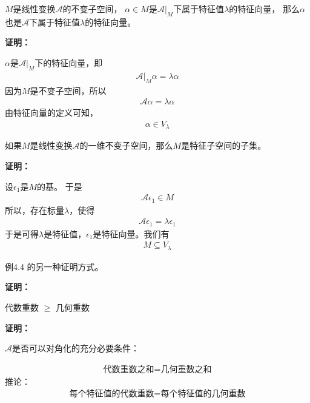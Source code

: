 \documentclass{article}
\begin{document}
\begin{zremark}
  $M$是线性变换$\mathscr{A}$的不变子空间，
  $\alpha \in M$是$\mathscr{A}|_M$下属于特征值$\lambda$的特征向量，
  那么$\alpha$也是$\mathscr{A}$下属于特征值$\lambda$的特征向量。
\end{zremark}

\textbf{证明：}

$\alpha$是$\mathscr{A}|_M$下的特征向量，即
\begin{align*}
  \mathscr{A}|_M \alpha = \lambda \alpha
\end{align*}
因为$M$是不变子空间，所以
\begin{align*}
  \mathscr{A} \alpha = \lambda \alpha
\end{align*}
由特征向量的定义可知，
\begin{align*}
  \alpha \in V_{\lambda}
\end{align*}

\begin{zremark}
  如果$M$是线性变换$\mathscr{A}$的一维不变子空间，那么$M$是特征子空间的子集。
\end{zremark}

\textbf{证明：}

设$\epsilon_1$是$M$的基。
于是
\begin{align*}
  \mathscr{A} \epsilon_1 \in M
\end{align*}
所以，存在标量$\lambda$，使得
\begin{align*}
  \mathscr{A} \epsilon_1 = \lambda \epsilon_1
\end{align*}
于是可得$\lambda$是特征值，$\epsilon_1$是特征向量。我们有
\begin{align*}
  M \subseteq V_\lambda
\end{align*}

\begin{zremark}
  例4.4 的另一种证明方式。
\end{zremark}

\textbf{证明：}

\begin{zremark}
  代数重数 $\geq$ 几何重数
\end{zremark}

\textbf{证明：}

\begin{zremark}
  $\mathscr{A}$是否可以对角化的充分必要条件：

  \begin{align*}
    \textbf{代数重数之和} = \textbf{几何重数之和}
  \end{align*}
  推论：
  \begin{align*}
    \textbf{每个特征值的代数重数} = \textbf{每个特征值的几何重数}
  \end{align*}
\end{zremark}
\end{document}
